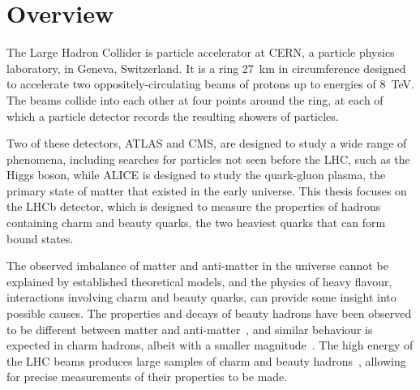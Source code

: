 \chapter{Overview}
\label{chap:intro:overview}

The Large Hadron Collider is particle accelerator at CERN, a particle physics 
laboratory, in Geneva, Switzerland.
It is a ring \SI{27}{\kilo\metre} in circumference designed to accelerate two 
oppositely-circulating beams of protons up to energies of \SI{8}{\TeV}.
The beams collide into each other at four points around the ring, at each of 
which a particle detector records the resulting showers of particles.


Two of these detectors, ATLAS and CMS, are designed to study a wide range of 
phenomena, including searches for particles not seen before the \ac{LHC}, such 
as the Higgs boson, while ALICE is designed to study the quark-gluon plasma, 
the primary state of matter that existed in the early universe.
This thesis focuses on the LHCb detector, which is designed to measure the 
properties of hadrons containing charm and beauty quarks, the two heaviest 
quarks that can form bound states.

The observed imbalance of matter and anti-matter in the universe cannot be 
explained by established theoretical models, and the physics of heavy flavour, 
interactions involving charm and beauty quarks, can provide some insight into 
possible causes.
The properties and decays of beauty hadrons have been observed to be different 
between matter and 
anti-matter~\cite{Aubert:2001nu,Abe:2001xe,Aaij:2012kz,Aaij:2013iua,Aaij:2016cla}, 
and similar behaviour is expected in charm hadrons, albeit with a smaller 
magnitude~\cite{Grossman:2006jg}.
The high energy of the \ac{LHC} beams produces large samples of charm and 
beauty hadrons~\cite{LHCb-PAPER-2012-041,LHCb-PAPER-2013-004}, allowing for 
precise measurements of their properties to be made.

